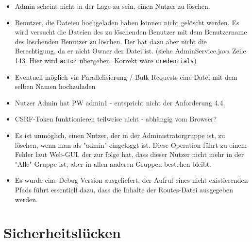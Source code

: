 \documentclass[12pt,DIV14,BCOR10mm,a4paper,parskip=half-,headsepline,headinclude,english,ngerman,bibliography=totocnumbered]{scrreprt}
\begin{document}
\begin{itemize} 
  \item Admin scheint nicht in der Lage zu sein, einen Nutzer zu löschen.  
  \item Benutzer, die Dateien hochgeladen haben können nicht gelöscht werden. Es wird versucht die Dateien des zu löschenden Benutzer mit dem Benutzername des löschenden Benutzer zu löschen. Der hat dazu aber nicht die Berechtigung, da er nicht Owner der Datei ist. (siehe AdminService.java Zeile 143. Hier wird \texttt{actor} übergeben. Korrekt wäre \texttt{credentials})
  \item Eventuell möglich via Parallelisierung / Bulk-Requests eine Datei mit dem selben Namen hochzuladen
  \item Nutzer Admin hat PW admin1 - entspricht nicht der Anforderung 4.4.
  \item CSRF-Token funktionieren teilweise nicht - abhängig vom Browser?
  \item Es ist unmöglich, einen Nutzer, der in der Administratorgruppe ist, zu löschen, wenn man als "admin" eingeloggt ist. Diese Operation führt zu einem Fehler laut Web-GUI, der zur folge hat, dass dieser Nutzer nicht mehr in der "Alle"-Gruppe ist, aber in allen anderen Gruppen bestehen bleibt.
  \item Es wurde eine Debug-Version ausgeliefert, der Aufruf eines nicht existierenden Pfads führt essentiell dazu, dass die Inhalte der Routes-Datei ausgegeben werden.
\end{itemize}

\chapter{Sicherheitslücken}
\end{document}
